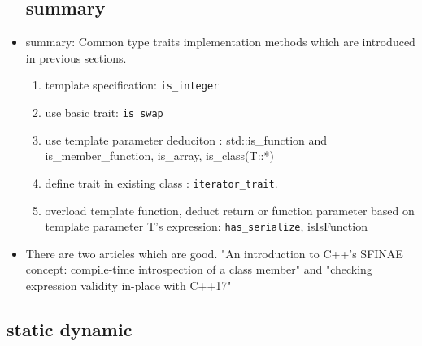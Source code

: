 \documentclass[a4paper,11pt,twoside]{book}
\begin{document}
\begin{itemize}
\begin{itemize}
\end{itemize}



\subsection{summary}
	
	\item summary: Common type traits implementation methods which are introduced in previous sections. 
	\begin{enumerate}
		\item template specification: \texttt{is\_integer}
		\item use basic trait: \texttt{is\_swap}
		\item use template parameter deduciton : std::is\_function and
		is\_member\_function, is\_array, is\_class(T::*)
		\item define trait in existing class : \texttt{iterator\_trait}.
		\item overload template function, deduct return or function parameter based on template parameter T's expression:  \texttt{has\_serialize}, isIsFunction
	\end{enumerate}

	\item There are two articles which are good.
"An introduction to C++'s SFINAE concept: compile-time introspection of a class member" and "checking expression validity in-place with C++17"
\end{itemize}




\subsection{static dynamic}
\end{document}
